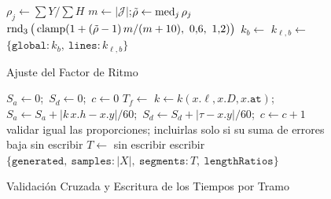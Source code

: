 \begin{figure}[ht]
\caption{Ajuste del Factor de Ritmo}\label{alg:ajuste-k}
\begin{algorithmic}[1]
   $\rho_j\gets\sum Y/\sum H$ \EndFor
  \State $m\gets|\mathcal J|$;\quad $\tilde\rho\gets\operatorname{med}_j\rho_j$
  \State \Return $\redondeo_3\big(\clamp(1+(\tilde\rho-1)\,m/(m+10),\ 0{,}6,\ 1{,}2)\big)$
\EndFunction
\Statex
{}
   $k_b\gets$ \EndFor
    \State $k_{\ell,b}\gets$
  \EndFor
  \State \Return $\{\texttt{global}:k_b,\ \texttt{lines}:k_{\ell,b}\}$
\EndFunction
\end{algorithmic}
\end{figure}

\begin{figure}[ht]
\caption{Validación Cruzada y Escritura de los Tiempos por Tramo}\label{alg:validacion}
\begin{algorithmic}[1]
  \State $S_a\gets0$;\ $S_d\gets0$;\ $c\gets0$
    \State $T_f\gets$
      \State $k\gets k(x.\ell,x.D,x.\texttt{at})$;\ $S_a\gets S_a+|k\,x.h-x.y|/60$;\ $S_d\gets S_d+|\tau-x.y|/60$;\ $c\gets c+1$
    \EndFor
  \EndFor
  \State validar igual las proporciones; incluirlas solo si su suma de errores baja
   \Return sin escribir \EndIf
  \State $T\gets$
   \Return sin escribir \EndIf
  \State escribir $\{\texttt{generated},\ \texttt{samples}:|X|,\ \texttt{segments}:T,\ \texttt{lengthRatios}\}$
\EndFunction
\end{algorithmic}
\end{figure}
